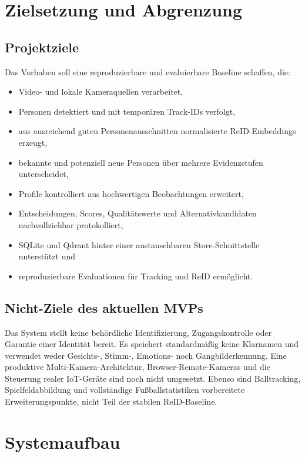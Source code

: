 \section{Zielsetzung und Abgrenzung}

\subsection{Projektziele}

Das Vorhaben soll eine reproduzierbare und evaluierbare Baseline schaffen, die:

\begin{itemize}[leftmargin=7mm]
  \item Video- und lokale Kameraquellen verarbeitet,
  \item Personen detektiert und mit temporären Track-IDs verfolgt,
  \item aus ausreichend guten Personenausschnitten normalisierte
    ReID-Embeddings erzeugt,
  \item bekannte und potenziell neue Personen über mehrere Evidenzstufen
    unterscheidet,
  \item Profile kontrolliert aus hochwertigen Beobachtungen erweitert,
  \item Entscheidungen, Scores, Qualitätswerte und Alternativkandidaten
    nachvollziehbar protokolliert,
  \item SQLite und Qdrant hinter einer austauschbaren Store-Schnittstelle
    unterstützt und
  \item reproduzierbare Evaluationen für Tracking und ReID ermöglicht.
\end{itemize}

\subsection{Nicht-Ziele des aktuellen MVPs}

Das System stellt keine behördliche Identifizierung, Zugangskontrolle oder
Garantie einer Identität bereit. Es speichert standardmäßig keine Klarnamen und
verwendet weder Gesichts-, Stimm-, Emotions- noch Gangbilderkennung. Eine
produktive Multi-Kamera-Architektur, Browser-Remote-Kameras und die Steuerung
realer IoT-Geräte sind noch nicht umgesetzt. Ebenso sind Balltracking,
Spielfeldabbildung und vollständige Fußballstatistiken vorbereitete
Erweiterungspunkte, nicht Teil der stabilen ReID-Baseline.


\section{Systemaufbau}

